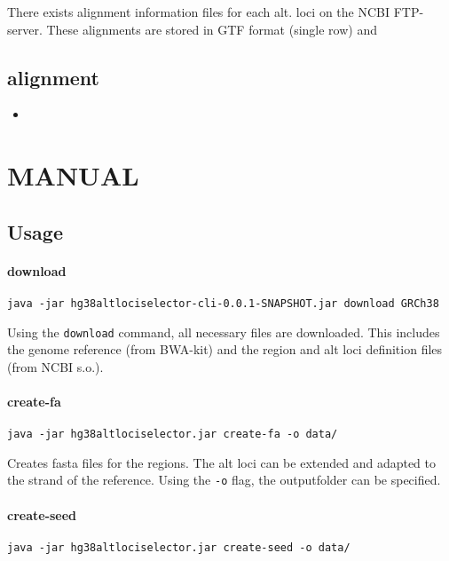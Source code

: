 \documentclass[10pt,a4paper]{article}
\begin{document}
There exists alignment information files for each alt. loci on the NCBI FTP-server. These alignments are stored in GTF format (single row) and 

\subsection*{alignment}

\begin{itemize}
\item 
\end{itemize}

\section*{MANUAL}

\subsection*{Usage}

\paragraph*{download}

\begin{verbatim}
java -jar hg38altlociselector-cli-0.0.1-SNAPSHOT.jar download GRCh38
\end{verbatim}

Using the \texttt{download} command, all necessary files are downloaded. This includes the genome reference (from BWA-kit) and the region and alt loci definition files (from NCBI s.o.).

\paragraph*{create-fa}
\begin{verbatim}
java -jar hg38altlociselector.jar create-fa -o data/
\end{verbatim}

Creates fasta files for the regions. The alt loci can be extended and adapted to the strand of the reference. Using the \texttt{-o} flag, the outputfolder can be specified.

\paragraph*{create-seed}
\begin{verbatim}
java -jar hg38altlociselector.jar create-seed -o data/
\end{verbatim}
\end{document}
